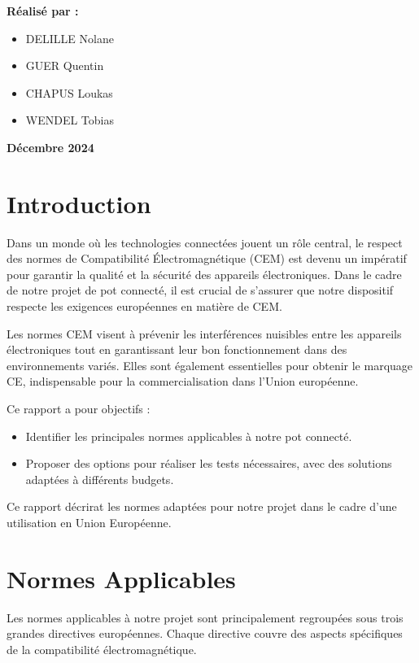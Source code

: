\documentclass[a4paper,12pt]{article}
\begin{document}
\begin{titlepage}
\begin{center}
        \vspace{4cm}
        \textbf{Réalisé par :}
        \vspace{0.5cm}
        \begin{itemize}
            \item DELILLE Nolane
            \item GUER Quentin
            \item CHAPUS Loukas
            \item WENDEL Tobias
        \end{itemize}

        \vfill
        \Large
        \textbf{Décembre 2024}
    \end{center}
\end{titlepage}

\newpage
\tableofcontents
\newpage
\newpage

\section*{Introduction}
Dans un monde où les technologies connectées jouent un rôle central, le respect des normes de Compatibilité Électromagnétique (CEM) est devenu un impératif pour garantir la qualité et la sécurité des appareils électroniques.
Dans le cadre de notre projet de pot connecté, il est crucial de s'assurer que notre dispositif respecte les exigences européennes en matière de CEM.

Les normes CEM visent à prévenir les interférences nuisibles entre les appareils électroniques tout en garantissant leur bon fonctionnement dans des environnements variés.
Elles sont également essentielles pour obtenir le marquage CE, indispensable pour la commercialisation dans l'Union européenne.

Ce rapport a pour objectifs :
\begin{itemize}
    \item Identifier les principales normes applicables à notre pot connecté.
    \item Proposer des options pour réaliser les tests nécessaires, avec des solutions adaptées à différents budgets.
\end{itemize}
Ce rapport décrirat les normes adaptées pour notre projet dans le cadre d'une utilisation en Union Européenne.

\section{Normes Applicables}
Les normes applicables à notre projet sont principalement regroupées sous trois grandes directives européennes. Chaque directive couvre des aspects spécifiques de la compatibilité électromagnétique.
\end{document}
